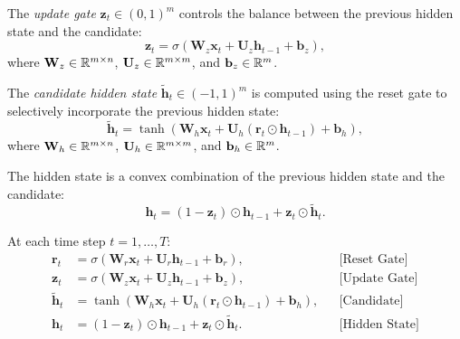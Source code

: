 \documentclass[11pt,a4paper]{article}
\begin{document}
\begin{definition}
\label{def:update-gate}
The \emph{update gate} $\mathbf{z}_t \in (0, 1)^m$ controls the
balance between the previous hidden state and the candidate:
\begin{equation}
  \boxed{\mathbf{z}_t = \sigma(\mathbf{W}_z \mathbf{x}_t +
    \mathbf{U}_z \mathbf{h}_{t-1} + \mathbf{b}_z)},
  \label{eq:update-gate}
\end{equation}
where $\mathbf{W}_z \in \mathbb{R}^{m \times n}$,
$\mathbf{U}_z \in \mathbb{R}^{m \times m}$, and $\mathbf{b}_z \in \mathbb{R}^m$.
\end{definition}

\begin{definition}
\label{def:gru-candidate}
The \emph{candidate hidden state} $\tilde{\mathbf{h}}_t \in
(-1, 1)^m$ is computed using the reset gate to selectively
incorporate the previous hidden state:
\begin{equation}
  \boxed{\tilde{\mathbf{h}}_t = \tanh(\mathbf{W}_h \mathbf{x}_t +
    \mathbf{U}_h (\mathbf{r}_t \odot \mathbf{h}_{t-1}) +
    \mathbf{b}_h)},
  \label{eq:gru-candidate}
\end{equation}
where $\mathbf{W}_h \in \mathbb{R}^{m \times n}$,
$\mathbf{U}_h \in \mathbb{R}^{m \times m}$, and $\mathbf{b}_h \in \mathbb{R}^m$.
\end{definition}

\begin{definition}
\label{def:gru-update}
The hidden state is a convex combination of the previous hidden
state and the candidate:
\begin{equation}
  \boxed{\mathbf{h}_t = (1 - \mathbf{z}_t) \odot \mathbf{h}_{t-1}
    + \mathbf{z}_t \odot \tilde{\mathbf{h}}_t}.
  \label{eq:gru-hidden}
\end{equation}
\end{definition}

\begin{keyresult}[title={GRU Forward Equations}]
At each time step $t = 1, \ldots, T$:
\begin{align}
  \mathbf{r}_t &= \sigma(\mathbf{W}_r \mathbf{x}_t +
    \mathbf{U}_r \mathbf{h}_{t-1} + \mathbf{b}_r),
    && \text{[Reset Gate]} \label{eq:gru-r} \\
  \mathbf{z}_t &= \sigma(\mathbf{W}_z \mathbf{x}_t +
    \mathbf{U}_z \mathbf{h}_{t-1} + \mathbf{b}_z),
    && \text{[Update Gate]} \label{eq:gru-z} \\
  \tilde{\mathbf{h}}_t &= \tanh(\mathbf{W}_h \mathbf{x}_t +
    \mathbf{U}_h (\mathbf{r}_t \odot \mathbf{h}_{t-1}) +
    \mathbf{b}_h),
    && \text{[Candidate]} \label{eq:gru-h-tilde} \\
  \mathbf{h}_t &= (1 - \mathbf{z}_t) \odot \mathbf{h}_{t-1} +
    \mathbf{z}_t \odot \tilde{\mathbf{h}}_t.
    && \text{[Hidden State]} \label{eq:gru-h}
\end{align}
\end{keyresult}
\end{document}
